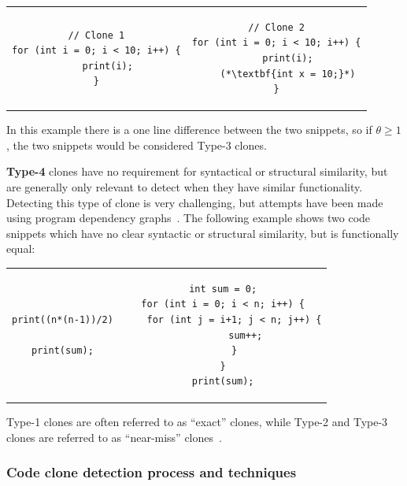 \begin{tcolorbox}
	\begin{center}
		\begin{tabular}{c | c}
			\begin{lstlisting}
// Clone 1
for (int i = 0; i < 10; i++) {
    print(i);
}
\end{lstlisting} &
			\begin{lstlisting}
// Clone 2
for (int i = 0; i < 10; i++) {
    print(i);
    (*\textbf{int x = 10;}*)
}
\end{lstlisting}
		\end{tabular}
	\end{center}
\end{tcolorbox}




In this example there is a one line difference between the two snippets, so if $\theta
	\geq
	1$, the two snippets would be considered Type-3 clones.

\textbf{Type-4} clones have no requirement for syntactical or structural similarity, but
are generally only relevant to detect when they have similar functionality. Detecting this
type of clone is very challenging, but attempts have been made using program dependency
graphs~\cite{SeedType4Detection}. The following example shows two code snippets which have
no clear syntactic or structural similarity, but is functionally equal:

\begin{tcolorbox}
	\begin{center}
		\begin{tabular}{c | c}
			\begin{lstlisting}
print((n*(n-1))/2)

print(sum);
\end{lstlisting} &
			\begin{lstlisting}
int sum = 0;
for (int i = 0; i < n; i++) {
    for (int j = i+1; j < n; j++) {
        sum++;
    }
}
print(sum);
\end{lstlisting}
		\end{tabular}
	\end{center}
\end{tcolorbox}


Type-1 clones are often referred to as ``exact'' clones, while Type-2 and Type-3 clones
are referred to as ``near-miss'' clones~\cite[1]{Zibran_real_time_search}.

\subsubsection{Code clone detection process and techniques}

